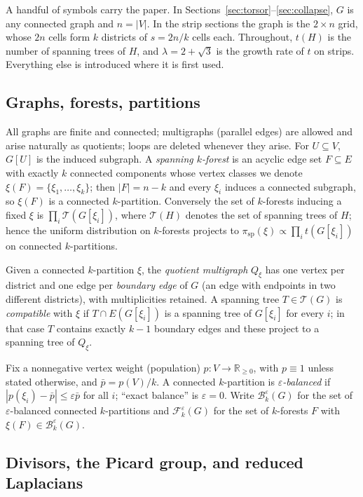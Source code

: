 \documentclass[11pt]{article}
\newcommand{\R}{\mathbb{R}}
\newcommand{\Tcal}{\mathcal{T}}
\newcommand{\Fcal}{\mathcal{F}}
\newcommand{\Bcal}{\mathcal{B}}
\begin{document}
A handful of symbols carry the paper. In
Sections~\ref{sec:torsor}--\ref{sec:collapse}, $G$ is any connected
graph and $n = |V|$. In the strip sections the graph is the
$2 \times n$ grid, whose $2n$ cells form $k$ districts of $s = 2n/k$
cells each. Throughout, $t(H)$ is the number of spanning trees of $H$,
and $\lambda = 2 + \sqrt 3$ is the growth rate of $t$ on strips.
Everything else is introduced where it is first used.

\subsection{Graphs, forests, partitions}

All graphs are finite and connected; multigraphs (parallel edges) are allowed
and arise naturally as quotients; loops are deleted whenever they arise. For
$U \subseteq V$, $G[U]$ is the induced subgraph. A \emph{spanning
$k$-forest} is an acyclic edge set $F \subseteq E$ with exactly $k$
connected components whose vertex classes we denote $\xi(F) = \{\xi_1,
\ldots, \xi_k\}$; then $|F| = n - k$ and every $\xi_i$ induces a connected
subgraph, so $\xi(F)$ is a connected $k$-partition. Conversely the set of
$k$-forests inducing a fixed $\xi$ is $\prod_i \Tcal(G[\xi_i])$, where
$\Tcal(H)$ denotes the set of spanning trees of $H$; hence the uniform
distribution on $k$-forests projects to $\pi_{\mathrm{sp}}(\xi) \propto
\prod_i t(G[\xi_i])$ on connected $k$-partitions.

Given a connected $k$-partition $\xi$, the \emph{quotient multigraph}
$Q_\xi$ has one vertex per district and one edge per \emph{boundary edge} of
$G$ (an edge with endpoints in two different districts), with multiplicities
retained. A spanning tree $T \in \Tcal(G)$ is \emph{compatible} with $\xi$
if $T \cap E(G[\xi_i])$ is a spanning tree of $G[\xi_i]$ for every $i$; in
that case $T$ contains exactly $k-1$ boundary edges and these project to a
spanning tree of $Q_\xi$.

Fix a nonnegative vertex weight (population) $p : V \to \R_{\ge 0}$, with
$p \equiv 1$ unless stated otherwise, and $\bar{p} = p(V)/k$. A connected
$k$-partition is \emph{$\varepsilon$-balanced} if
$|p(\xi_i) - \bar{p}| \le \varepsilon \bar{p}$ for all $i$; ``exact
balance'' is $\varepsilon = 0$. Write $\Bcal_k^\varepsilon(G)$ for the set
of $\varepsilon$-balanced connected $k$-partitions and
$\Fcal_k^\varepsilon(G)$ for the set of $k$-forests $F$ with
$\xi(F) \in \Bcal_k^\varepsilon(G)$.

\subsection{Divisors, the Picard group, and reduced Laplacians}
\end{document}
